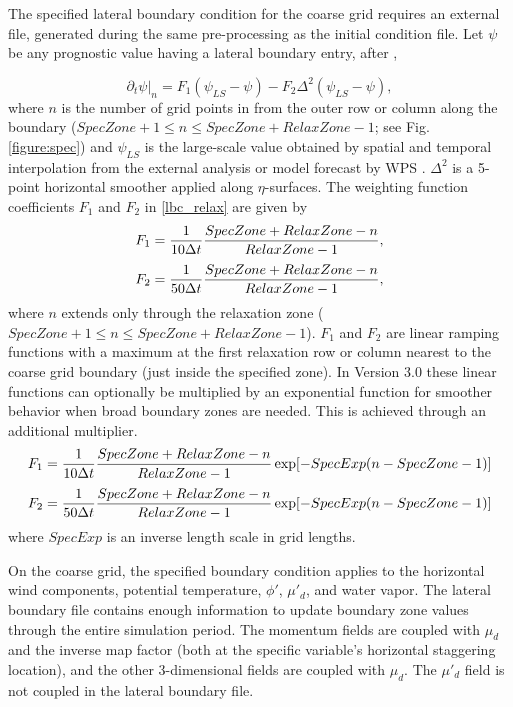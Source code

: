 The specified lateral boundary condition for the coarse grid 
requires an external file, generated
during the same pre-processing as the initial condition file.
Let $\psi$ be any prognostic value having a lateral boundary entry, after \cite{daviesturner77},

\begin{equation}
\partial_t \psi \big|_n = F_1(\psi_{LS} - \psi) - F_2 \Delta^2(\psi_{LS} - \psi),
\label{lbc_relax}
\end{equation}
\noindent where $n$ is the number of grid points in from the outer row or column along the boundary
($SpecZone + 1 \leq n \leq SpecZone + RelaxZone - 1$; see Fig. \ref{figure:spec}) 
and $\psi_{LS}$ is the large-scale value obtained by spatial and temporal interpolation from the external analysis or model forecast by WPS .  $\Delta^2$
is a 5-point horizontal smoother applied along $\eta$-surfaces.
The weighting function
coefficients $F_1$ and $F_2$ in \eqref{lbc_relax} are given by
\begin{equation}
F_1 = {1 \over {10 \Delta t }} {{SpecZone + RelaxZone - n} \over {RelaxZone - 1}},
\notag
\end{equation}
\begin{equation}
F_2 = {1 \over {50 \Delta t }} {{SpecZone + RelaxZone - n} \over {RelaxZone - 1}},
\notag
\end{equation}
\noindent where $n$ extends only through the relaxation zone 
($SpecZone + 1 \leq n \leq SpecZone + RelaxZone - 1$).
$F_1$ and $F_2$ are
linear ramping functions with a maximum at the first relaxation row or column 
nearest to the coarse grid boundary (just inside the specified zone).  
In Version 3.0 these linear functions can optionally be multiplied by an
exponential function for smoother behavior when broad boundary zones are
needed. This is achieved through an additional multiplier.
\begin{equation}
F_1 = {1 \over {10 \Delta t }} {{SpecZone + RelaxZone - n} \over {RelaxZone - 1}}
\exp [ - SpecExp ( n - SpecZone - 1)]
\notag
\end{equation}
\begin{equation}
F_2 = {1 \over {50 \Delta t }} {{SpecZone + RelaxZone - n} \over {RelaxZone - 1}}
\exp [ - SpecExp ( n - SpecZone - 1)]
\notag
\end{equation}
where $SpecExp$ is an inverse length scale in grid lengths.

On the coarse grid, the specified boundary condition applies to 
the horizontal wind components, potential temperature, $\phi'$, $\mu'_d$, and water vapor. 
The lateral boundary file contains enough information to update
boundary zone values through the entire simulation period.  The momentum fields are 
coupled with $\mu_d$ and the inverse map factor (both at the specific variable's
horizontal staggering location), and the other 3-dimensional fields are coupled with
$\mu_d$.  The $\mu'_d$ field is not coupled in the lateral boundary file.

